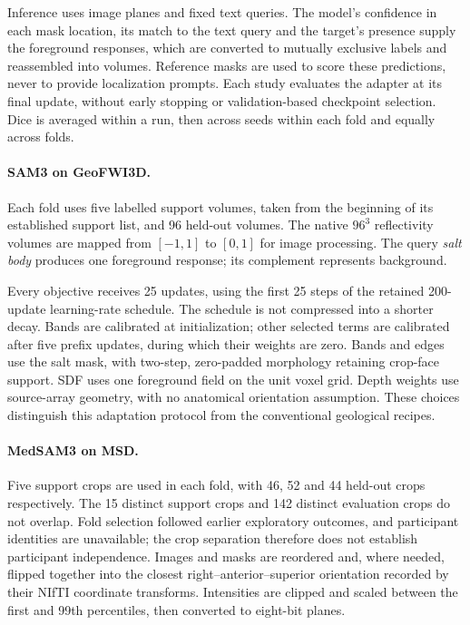 \documentclass[12pt,a4paper]{article}
\begin{document}
Inference uses image planes and fixed text queries. The model's confidence
in each mask location, its match to the text query and the target's presence
supply the foreground responses, which are converted to mutually exclusive
labels and reassembled into volumes. Reference masks are used to score these
predictions, never to provide localization prompts. Each study evaluates the
adapter at its final update, without early stopping or validation-based
checkpoint selection. Dice is averaged within a run, then across seeds
within each fold and equally across folds.

\paragraph{SAM3 on GeoFWI3D.}\label{sec:sam3-methods}
Each fold uses five labelled support volumes, taken from the beginning
of its established support list, and 96 held-out volumes. The native
$96^3$ reflectivity volumes are mapped from $[-1,1]$ to $[0,1]$ for
image processing. The query \emph{salt body} produces one foreground
response; its complement represents background.

Every objective receives 25 updates, using the first 25 steps of the
retained 200-update learning-rate schedule. The schedule is not compressed
into a shorter decay. Bands are calibrated at initialization; other selected
terms are calibrated after five prefix updates, during which their weights
are zero. Bands and edges use the salt mask, with two-step, zero-padded
morphology retaining crop-face support. SDF uses one foreground field on the
unit voxel grid. Depth weights use source-array geometry, with no anatomical
orientation assumption. These choices distinguish this adaptation protocol
from the conventional geological recipes.

\paragraph{MedSAM3 on MSD.}\label{sec:medsam-methods}
Five support crops are used in each fold, with 46, 52 and 44 held-out
crops respectively. The 15 distinct support crops and 142 distinct
evaluation crops do not overlap. Fold selection followed earlier
exploratory outcomes, and participant identities are unavailable; the
crop separation therefore does not establish participant independence.
Images and masks are reordered and, where needed, flipped together
into the closest right--anterior--superior orientation recorded by their
NIfTI coordinate transforms. Intensities are clipped and scaled between the first and
99th percentiles, then converted to eight-bit planes.
\end{document}
